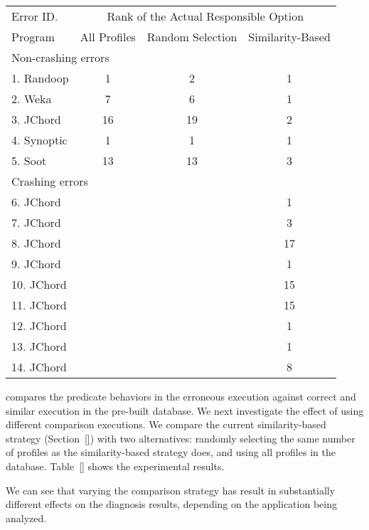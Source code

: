 \begin{table}[t]
\setlength{\tabcolsep}{.24\tabcolsep}
\begin{tabular}{|l|c|c||c|}
\hline
 Error ID. & \multicolumn{3}{|c|}{Rank of the Actual Responsible Option } \\
\cline{2-4}
 Program & All Profiles & Random Selection&  Similarity-Based\\
 \hline
\hline
\multicolumn{4}{|l|}{Non-crashing errors}   \\
 \hline
 1. Randoop & 1 & 2 & 1\\
 2. Weka & 7 & 6 & 1\\
 3. JChord & 16 & 19 & 2\\
 4. Synoptic & 1 & 1 & 1\\
 5. Soot & 13 & 13 & 3\\
\hline
\hline
\multicolumn{4}{|l|}{Crashing errors}   \\
\hline
 6. JChord & & &1\\
 7. JChord & & &3\\
 8. JChord & & &17\\
 9. JChord & & &1\\
 10. JChord & & &15\\
 11. JChord & & &15\\
 12. JChord & & &1\\
 13. JChord & & &1\\
 14. JChord & & &8\\
\hline
\end{tabular}

\end{table}


\ourtool compares the predicate behaviors in the erroneous execution against
correct and similar execution in the pre-built database.
We next investigate the effect of using different comparison
executions. We compare the current similarity-based strategy (Section~\ref{})
with two alternatives: randomly selecting the same number of
profiles as the similarity-based strategy does, and using
all profiles in the database. Table~\ref{} shows the experimental results.

We can see that varying the comparison strategy has result in
substantially different effects on the diagnosis results,
depending on the application being analyzed.

